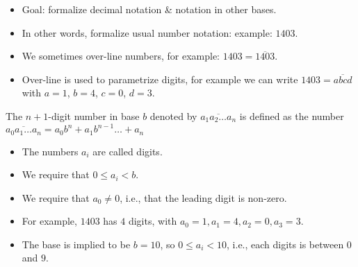 \begin{frame}
\begin{itemize}
\item Goal: formalize decimal notation \& notation in other bases.
\item In other words, formalize usual number notation: example: $1403$. 
\item We sometimes over-line numbers, for example: $1403 =\overline{1403}$.
\item Over-line is used to parametrize digits, for example we can write $1403=\overline{abcd}$ with $a=1$, $b=4$, $c=0$, $d=3$.
\end{itemize}
\begin{definition}
The $n+1$-digit number in base $b$ denoted by $\overline{a_1a_2\dots a_n}$ is defined as the number
$
\overline{a_0a_1\dots a_{n}} = a_0 b^n + a_1 b^{n-1} \dots + a_n
$
\begin{itemize}
\item The numbers $a_i$ are called digits.
\item We require that $0\leq a_i < b$.
\item We require that $a_0 \neq 0$, i.e., that the leading digit is non-zero.
\end{itemize}
\end{definition}
\begin{itemize}
\item For example, $1403$ has $4$ digits, with $a_0 = 1, a_1 = 4, a_2 = 0, a_3 = 3$.
\item The base is implied to be $b=10$, so $0\leq a_i<10$, i.e., each digits is between $0$ and $9$. 
\end{itemize}
\end{frame}